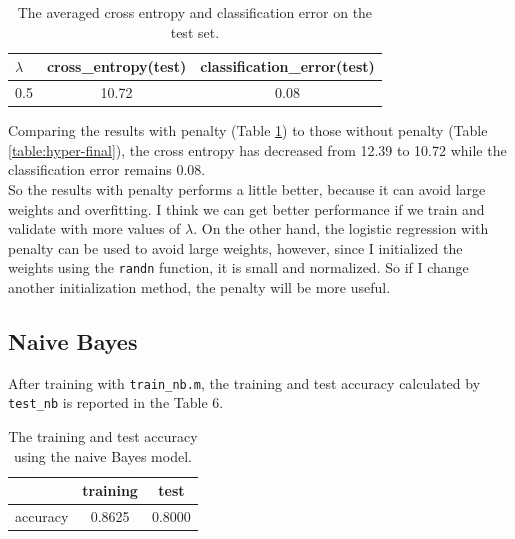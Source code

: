 \documentclass{article}
\begin{document}
\begin{table}[htbp]
\centering
\begin{tabular}{lcc}
\toprule
$\lambda$ & cross\_entropy(test) & classification\_error(test) \\
\midrule
0.5 & 10.72 & 0.08\\
\bottomrule
\end{tabular}
\caption{The averaged cross entropy and classification error on the test set. 
\label{table:test-final}}
\end{table}

Comparing the results with penalty (Table \ref{table:test-final}) to those without penalty (Table \ref{table:hyper-final}), the cross entropy has decreased from 12.39 to 10.72 while the classification error remains 0.08. \\

So the results with penalty performs a little better, because it can avoid large weights and overfitting. I think we can get better performance if we train and validate with more values of $\lambda$. On the other hand, the logistic regression with penalty can be used to avoid large weights, however, since I initialized the weights using the \texttt{randn} function, it is small and normalized. So if I change another initialization method, the penalty will be more useful.\\

\subsection{Naive Bayes}

After training with \texttt{train\_nb.m}, the training and test accuracy calculated by \texttt{test\_nb} is reported in the Table 6.\\

\begin{table}[htbp]
\centering
\begin{tabular}{lcc}
\toprule
\ & training & test \\
\midrule
accuracy & 0.8625 & 0.8000\\
\bottomrule
\end{tabular}
\caption{The training and test accuracy using the naive Bayes model. 
\label{table:acc-nb}}
\end{table}
\end{document}

